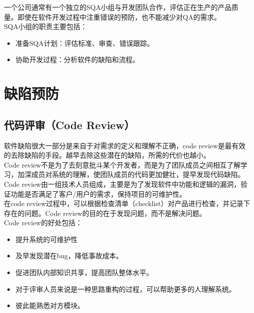 一个公司通常有一个独立的SQA小组与开发团队合作，评估正在生产的产品质量。即使在软件开发过程中注重错误的预防，也不能减少对QA的需求。\\

SQA小组的职责主要包括：

\begin{itemize}
    \item 准备SQA计划：评估标准、审查、错误跟踪。
    \item 协助开发过程：分析软件的缺陷和流程。
\end{itemize}

\newpage

\section{缺陷预防}

\subsection{代码评审（Code Review）}

软件缺陷很大一部分是来自于对需求的定义和理解不正确，code review是最有效的去除缺陷的手段。越早去除这些潜在的缺陷，所需的代价也越小。\\

Code review不是为了去刻意批斗某个开发者，而是为了团队成员之间相互了解学习，加深成员对系统的理解，使团队成员的代码更加健壮，提早发现代码缺陷。\\

Code review由一组技术人员组成，主要是为了发现软件中功能和逻辑的漏洞，验证功能是否满足了客户/用户的需求，保持项目的可维护性。\\

在code review过程中，可以根据检查清单（checklist）对产品进行检查，并记录下存在的问题。Code review的目的在于发现问题，而不是解决问题。\\

Code review的好处包括：

\begin{itemize}
    \item 提升系统的可维护性

    \item 及早发现潜在bug，降低事故成本。

    \item 促进团队内部知识共享，提高团队整体水平。

    \item 对于评审人员来说是一种思路重构的过程，可以帮助更多的人理解系统。

    \item 彼此能熟悉对方模块。
\end{itemize}

